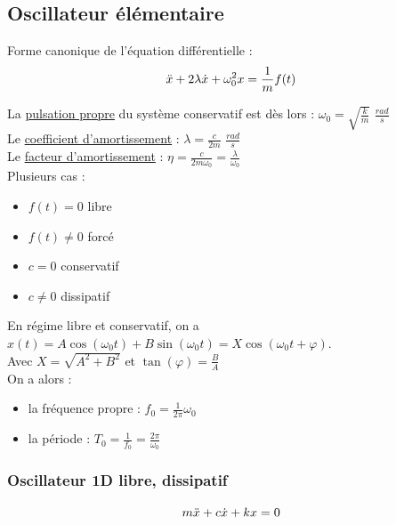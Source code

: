 \documentclass[../main.tex]{subfiles}
\begin{document}
\localtableofcontents
\subsection{Oscillateur élémentaire}
Forme canonique de l'équation différentielle : \begin{equation}
    \Ddot{x} + 2 \lambda \dot{x} + \omega_0^2 x = \frac{1}{m} f(t)
\end{equation}

La \underline{pulsation propre} du système conservatif est dès lors : $\omega_0 = \sqrt{\frac{k}{m}}$ $\frac{rad}{s}$\\

Le \underline{coefficient d'amortissement} : $\lambda = \frac{c}{2m}$ $\frac{rad}{s}$\\

Le \underline{facteur d'amortissement} : $\eta = \frac{c}{2m \omega_0} = \frac{\lambda}{\omega_0}$\\

Plusieurs cas : \begin{itemize}
    \item $f(t)=0$ libre\\
    \item $f(t) \neq 0$ forcé\\
    \item $c=0$ conservatif\\
    \item $c \neq 0$ dissipatif\\
\end{itemize}

En régime libre et conservatif, on a $x(t) = A\cos(\omega_0 t) + B\sin(\omega_0 t) = X \cos(\omega_0 t + \varphi)$.\\
Avec $X = \sqrt{A^2+B^2}$ et $\tan(\varphi) = \frac{B}{A}$\\
On a alors : \begin{itemize}
    \item la fréquence propre : $f_0 = \frac{1}{2\pi} \omega_0$\\
    \item la période : $T_0 = \frac{1}{f_0} = \frac{2\pi}{\omega_0}$\\
\end{itemize}
\subsubsection{Oscillateur 1D libre, dissipatif}
\begin{equation}
    m \Ddot{x} + c \dot{x} + kx = 0 
\end{equation}
\end{document}
